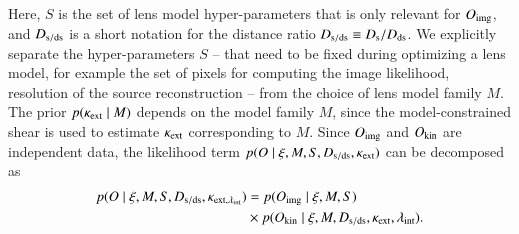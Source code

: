 \documentclass[longauth]{aa}
\newcommand{\Ds}{D_{\rm s}}
\newcommand{\Dds}{D_{\rm ds}}
\newcommand{\rmd}{{\rm d}}
\newcommand{\suyu}[1]{{{#1}}}
\begin{document}
%
Here, $S$ is the set of lens model hyper-parameters that is only relevant for $O_{\rm img}$, and $D_{\rm s/ds}$ is a short notation for the distance ratio $D_{\rm s/ds} \equiv \Ds / \Dds$. We explicitly separate the hyper-parameters $S$ -- that need to be fixed during optimizing a lens model, for example the set of pixels for computing the image likelihood, resolution of the source reconstruction -- from the choice of lens model family $M$. The prior $p(\kappa_{\rm ext} \mid M)$ depends on the model family $M$, since the model-constrained shear is used to estimate $\kappa_{\rm ext}$ corresponding to $M$. Since $O_{\rm img}$ and $O_{\rm kin}$ are independent data, the likelihood term $p(O \mid \xi, M, S, D_{\rm s/ds}, \kappa_{\rm ext})$ can be decomposed as
%
\begin{equation} \label{eq:likelihood_decomposition}
\begin{split}
        p(O \mid \xi, M, S, D_{\rm s/ds}, \kappa_{\rm ext, \lambda_{\rm int}}) &= p(O_{\rm img} \mid \xi, M, S) \\
         & \times p(O_{\rm kin} \mid \xi, M, D_{\rm s/ds}, \kappa_{\rm ext}, \lambda_{\rm int}). 
\end{split}
\end{equation}
\end{document}
